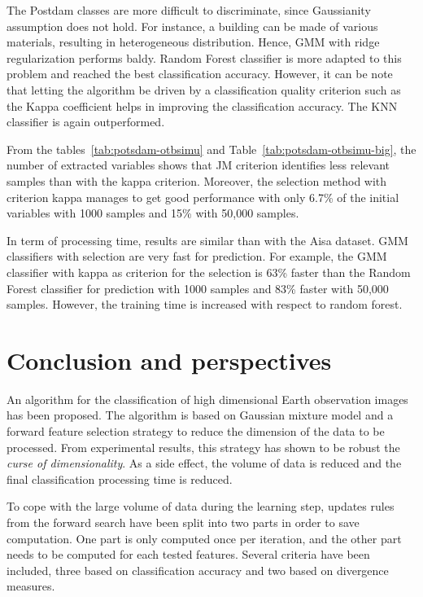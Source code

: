 \documentclass[journal,peerreview,onecolumn]{IEEEtran}
\begin{document}
    The  Postdam classes  are  more difficult  to discriminate,  since
    Gaussianity assumption  does not  hold. For instance,  a building
    can  be  made of  various  materials,  resulting in  heterogeneous
    distribution.   Hence,  GMM  with  ridge  regularization  performs
    baldy. Random  Forest classifier is  more adapted to  this problem
    and reached the  best classification accuracy. However,  it can be
    note  that letting  the algorithm  be driven  by a  classification
    quality criterion such as the Kappa coefficient helps in improving
    the  classification   accuracy.  The   KNN  classifier   is  again
    outperformed.

    From        the        tables~\ref{tab:potsdam-otbsimu}        and
    Table~\ref{tab:potsdam-otbsimu-big},   the  number   of  extracted
    variables shows that JM criterion identifies less relevant samples
    than with the kappa criterion. Moreover, the selection method with
    criterion kappa manages to get good performance with only 6.7\% of
    the  initial variables  with  1000 samples  and  15\% with  50,000
    samples.

    In term of processing time, results are similar than with the Aisa
    dataset.  GMM  classifiers  with   selection  are  very  fast  for
    prediction.  For  example,  the   GMM  classifier  with  kappa  as
    criterion for the selection is  63\% faster than the Random Forest
    classifier for prediction  with 1000 samples and  83\% faster with
    50,000  samples.  However, the  training  time  is increased  with
    respect to random forest.

\section{Conclusion and perspectives}
\label{sec:conclusion}

An algorithm for the classification of high dimensional Earth observation images has been proposed. The algorithm is based on Gaussian mixture model and a forward feature selection strategy to reduce the dimension of the data to be processed. From experimental results, this strategy has shown to be robust the \emph{curse of dimensionality}. As a side effect, the volume of data is reduced and the final classification processing time is reduced. 

To cope with the large volume of data during the learning step, updates rules from the forward search have been split into two parts in order to save computation. One part is only computed once per iteration, and the other part needs to be computed for each tested features. Several criteria have been included, three based on classification accuracy and two based on divergence measures.
\end{document}

